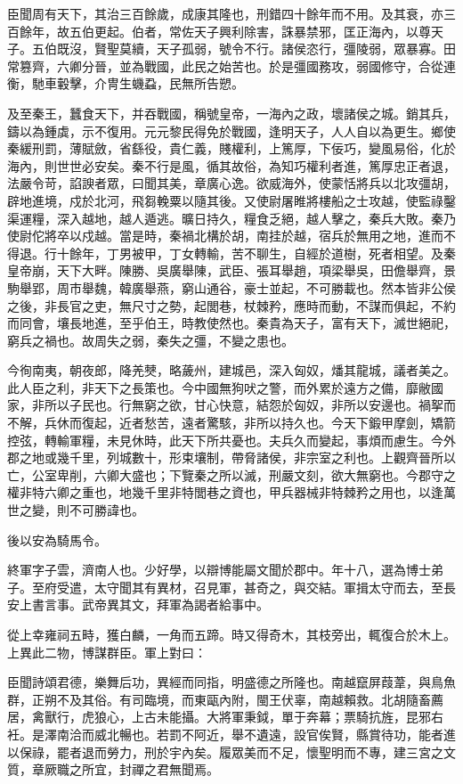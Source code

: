 \begin{pinyinscope}
臣聞周有天下，其治三百餘歲，成康其隆也，刑錯四十餘年而不用。及其衰，亦三百餘年，故五伯更起。伯者，常佐天子興利除害，誅暴禁邪，匡正海內，以尊天子。五伯既沒，賢聖莫續，天子孤弱，號令不行。諸侯恣行，彊陵弱，眾暴寡。田常篡齊，六卿分晉，並為戰國，此民之始苦也。於是彊國務攻，弱國修守，合從連衡，馳車轂擊，介冑生蟣蝨，民無所告愬。

及至秦王，蠶食天下，并吞戰國，稱號皇帝，一海內之政，壞諸侯之城。銷其兵，鑄以為鍾虡，示不復用。元元黎民得免於戰國，逢明天子，人人自以為更生。鄉使秦緩刑罰，薄賦斂，省繇役，貴仁義，賤權利，上篤厚，下佞巧，變風易俗，化於海內，則世世必安矣。秦不行是風，循其故俗，為知巧權利者進，篤厚忠正者退，法嚴令苛，諂諛者眾，曰聞其美，章廣心逸。欲威海外，使蒙恬將兵以北攻彊胡，辟地進境，戍於北河，飛芻輓粟以隨其後。又使尉屠睢將樓船之士攻越，使監祿鑿渠運糧，深入越地，越人遁逃。曠日持久，糧食乏絕，越人擊之，秦兵大敗。秦乃使尉佗將卒以戍越。當是時，秦禍北構於胡，南挂於越，宿兵於無用之地，進而不得退。行十餘年，丁男被甲，丁女轉輸，苦不聊生，自經於道樹，死者相望。及秦皇帝崩，天下大畔。陳勝、吳廣舉陳，武臣、張耳舉趙，項梁舉吳，田儋舉齊，景駒舉郢，周市舉魏，韓廣舉燕，窮山通谷，豪士並起，不可勝載也。然本皆非公侯之後，非長官之吏，無尺寸之勢，起閭巷，杖棘矜，應時而動，不謀而俱起，不約而同會，壤長地進，至乎伯王，時教使然也。秦貴為天子，富有天下，滅世絕祀，窮兵之禍也。故周失之弱，秦失之彊，不變之患也。

今徇南夷，朝夜郎，降羌僰，略薉州，建城邑，深入匈奴，燔其龍城，議者美之。此人臣之利，非天下之長策也。今中國無狗吠之警，而外累於遠方之備，靡敝國家，非所以子民也。行無窮之欲，甘心快意，結怨於匈奴，非所以安邊也。禍挐而不解，兵休而復起，近者愁苦，遠者驚駭，非所以持久也。今天下鍛甲摩劍，矯箭控弦，轉輸軍糧，未見休時，此天下所共憂也。夫兵久而變起，事煩而慮生。今外郡之地或幾千里，列城數十，形束壤制，帶脅諸侯，非宗室之利也。上觀齊晉所以亡，公室卑削，六卿大盛也；下覽秦之所以滅，刑嚴文刻，欲大無窮也。今郡守之權非特六卿之重也，地幾千里非特閭巷之資也，甲兵器械非特棘矜之用也，以逢萬世之變，則不可勝諱也。

後以安為騎馬令。

終軍字子雲，濟南人也。少好學，以辯博能屬文聞於郡中。年十八，選為博士弟子。至府受遣，太守聞其有異材，召見軍，甚奇之，與交結。軍揖太守而去，至長安上書言事。武帝異其文，拜軍為謁者給事中。

從上幸雍祠五畤，獲白麟，一角而五蹄。時又得奇木，其枝旁出，輒復合於木上。上異此二物，博謀群臣。軍上對曰：

臣聞詩頌君德，樂舞后功，異經而同指，明盛德之所隆也。南越竄屏葭葦，與鳥魚群，正朔不及其俗。有司臨境，而東甌內附，閩王伏辜，南越賴救。北胡隨畜薦居，禽獸行，虎狼心，上古未能攝。大將軍秉鉞，單于奔幕；票騎抗旌，昆邪右衽。是澤南洽而威北暢也。若罰不阿近，舉不遺遠，設官俟賢，縣賞待功，能者進以保祿，罷者退而勞力，刑於宇內矣。履眾美而不足，懷聖明而不專，建三宮之文質，章厥職之所宜，封禪之君無聞焉。


\end{pinyinscope}
